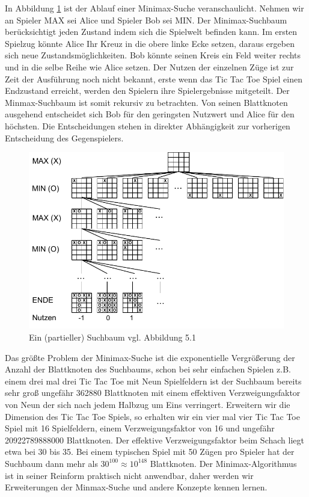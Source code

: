 In Abbildung \ref{fig:minimax_tictactoe} ist der Ablauf einer Minimax-Suche veranschaulicht. Nehmen wir an Spieler MAX sei Alice und Spieler Bob sei MIN. Der Minimax-Suchbaum berücksichtigt jeden Zustand indem sich die Spielwelt befinden kann. Im ersten Spielzug könnte Alice Ihr Kreuz in die obere linke Ecke setzen, daraus ergeben sich neue Zustandsmöglichkeiten. Bob könnte seinen Kreis ein Feld weiter rechts und in die selbe Reihe wie Alice setzen. Der Nutzen der einzelnen Züge ist zur Zeit der Ausführung noch nicht bekannt, erste wenn das Tic Tac Toe Spiel einen Endzustand erreicht, werden den Spielern ihre Spielergebnisse mitgeteilt. Der Minmax-Suchbaum ist somit rekursiv zu betrachten. Von seinen Blattknoten ausgehend entscheidet sich Bob für den geringsten Nutzwert und Alice für den höchsten. Die Entscheidungen stehen in direkter Abhängigkeit zur vorherigen Entscheidung des Gegenspielers.
  
\begin{figure}[!htbp]
  \centering
  \includegraphics{inhalt/abbildungen/minimax_tictactoe.pdf}
  \caption{Ein (partieller) Suchbaum vgl. Abbildung 5.1 \cite[208]{Russell}}
  \label{fig:minimax_tictactoe}
\end{figure} 

Das größte Problem der Minimax-Suche ist die exponentielle Vergrößerung der Anzahl der Blattknoten des Suchbaums, schon bei sehr einfachen Spielen z.B. einem drei mal drei Tic Tac Toe mit Neun Spielfeldern ist der Suchbaum bereits sehr groß ungefähr 362880 Blattknoten mit einem effektiven Verzweigungsfaktor von Neun der sich nach jedem Halbzug um Eins verringert. Erweitern wir die Dimension des Tic Tac Toe Spiels, so erhalten wir ein vier mal vier Tic Tac Toe Spiel mit 16 Spielfeldern, einem Verzweigungsfaktor von 16 und ungefähr 20922789888000 Blattknoten. Der effektive Verzweigungsfaktor beim Schach liegt etwa bei 30 bis 35. Bei einem typischen Spiel mit 50 Zügen pro Spieler hat der Suchbaum dann mehr als $30^{100} \approx 10^{148}$ Blattknoten\cite[114]{Ertel}. Der Minimax-Algorithmus ist in seiner Reinform praktisch nicht anwendbar, daher werden wir Erweiterungen der Minmax-Suche und andere Konzepte kennen lernen.

